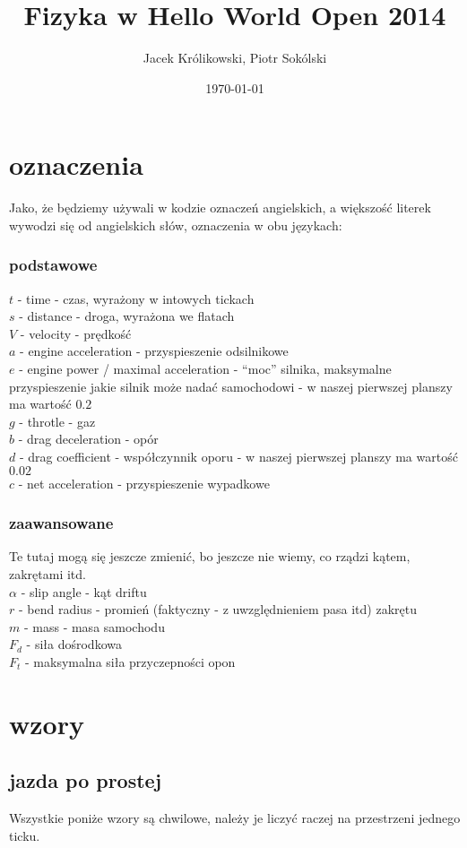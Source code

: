 \documentclass[12pt]{article}
\title{Fizyka w Hello World Open 2014}
\author{Jacek Królikowski, Piotr Sokólski}
\date{\today}
\begin{document}
\sloppy
\maketitle
\section{oznaczenia}
Jako, że będziemy używali w kodzie oznaczeń angielskich, a większość literek wywodzi się od angielskich słów, oznaczenia w obu językach:

\subsubsection{podstawowe}
$t$ - time - czas, wyrażony w intowych tickach \\
$s$ - distance - droga, wyrażona we flatach \\
$V$ - velocity - prędkość \\
$a$ - engine acceleration - przyspieszenie odsilnikowe \\
$e$ - engine power / maximal acceleration - ``moc'' silnika, maksymalne przyspieszenie jakie silnik może nadać samochodowi - w naszej pierwszej planszy ma wartość $0.2$  \\
$g$ - throtle - gaz \\
$b$ - drag deceleration - opór \\
$d$ - drag coefficient - współczynnik oporu - w naszej pierwszej planszy ma wartość $0.02$ \\
$c$ - net acceleration - przyspieszenie wypadkowe
\subsubsection{zaawansowane}
Te tutaj mogą się jeszcze zmienić, bo jeszcze nie wiemy, co rządzi kątem, zakrętami itd.\\
$\alpha$ - slip angle - kąt driftu\\
$r$ - bend radius - promień (faktyczny - z uwzględnieniem pasa itd) zakrętu\\
$m$ - mass - masa samochodu \\
$F_d$ - siła dośrodkowa \\
$F_t$ - maksymalna siła przyczepności opon \\
\section{wzory}
\subsection{jazda po prostej}
Wszystkie poniże wzory są chwilowe, należy je liczyć raczej na przestrzeni jednego ticku.
\end{document}
